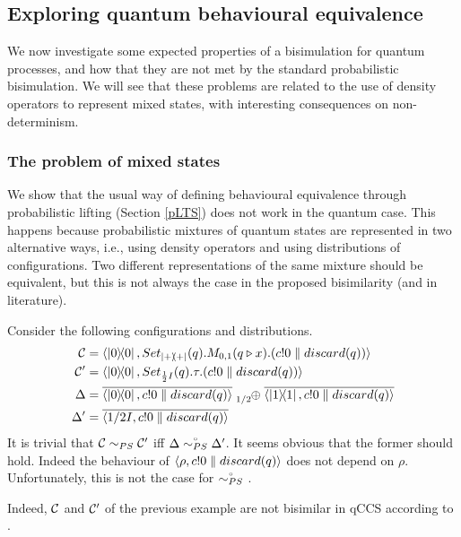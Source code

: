 \subsection{Exploring quantum behavioural equivalence}
We now investigate some expected properties of a bisimulation for quantum processes, and how that they are not met by the standard probabilistic bisimulation. We will see that these problems are related to the use of density operators to represent mixed states, with interesting consequences on non-determinism.

\subsubsection*{The problem of mixed states}

We show that the usual way of defining behavioural equivalence through probabilistic lifting (Section \ref{pLTS}) does not work in the quantum case.
This happens because probabilistic mixtures of quantum states are represented in two alternative ways, i.e., using density operators and using distributions of configurations.
Two different representations of the same mixture should be equivalent, but this is not always the case in the proposed bisimilarity (and in literature).

\begin{example}
	Consider the following configurations and distributions.
	\begin{align*}
		\conf &= \confw{\ketbra{0}{0}, Set_{\ketbra{+}{+}}(q).M_{0,1}(q \triangleright x).(c!0 \parallel discard(q))}\\
		\conf' &= \confw{\ketbra{0}{0}, Set_{\frac{1}{2} I}(q).\tau.(c!0 \parallel discard(q))}\\
		\Delta &= \overline{\confw{\ketbra{0}{0}, c!0 \parallel discard(q)}} \psum{1/2} \overline{\confw{\ketbra{1}{1}, c!0 \parallel discard(q)}}\\
		\Delta' &= \overline{\confw{1/2 I, c!0 \parallel discard(q)}}
	\end{align*}
	It is trivial that $\mathcal{C} \sim_{PS} \mathcal{C}'$ iff $\Delta	\stackrel{\scriptscriptstyle \circ}{\sim_{PS}} \Delta'$.
	It seems obvious that the former should hold.
	Indeed the behaviour of $\langle\rho, c!0 \parallel discard(q)\rangle$ does not depend on $\rho$.
	Unfortunately, this is not the case for $\stackrel{\scriptscriptstyle \circ}{\sim_{PS}}$ .
\end{example}
Indeed, $\mathcal{C}$ and $\mathcal{C}'$ of the previous example are not bisimilar in qCCS according to \cite{fengBisimulationQuantumProcesses2012, dengOpenBisimulationQuantum2012}.

